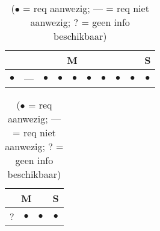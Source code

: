 \begin{table}[htbp]
    \centering
    \begin{minipage}{0.48\textwidth}
        \centering
        \begin{tabular}{|ccccccccc|c|}
            \hline
            \multicolumn{9}{|c|}{M} & \multicolumn{1}{c|}{S} \\
            \midrule
            $\bullet$ & --- & $\bullet$ & $\bullet$ & $\bullet$ & $\bullet$ & $\bullet$ & $\bullet$ & $\bullet$ & $\bullet$ \\
            \bottomrule
        \end{tabular}
        \caption{amCharts Woordwolk - Functionele requirements}
    \end{minipage}
    \hfill
    \begin{minipage}{0.48\textwidth}
        \centering
        \begin{tabular}{|ccc|c|}
            \hline
            \multicolumn{3}{|c|}{M} & \multicolumn{1}{c|}{S} \\
            \midrule
            ? & $\bullet$ & $\bullet$ & $\bullet$ \\
            \bottomrule
        \end{tabular}
        \caption{amCharts Woordwolk - Niet-functionele requirements}
    \end{minipage}
    \caption*{($\bullet$ = req aanwezig; --- = req niet aanwezig; ? = geen info beschikbaar)}
\end{table}
